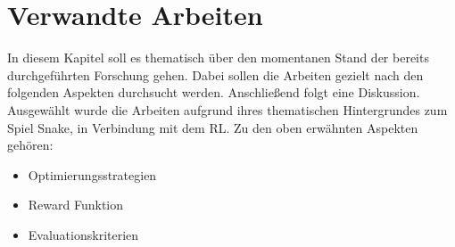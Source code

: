 \chapter{Verwandte Arbeiten} \label{chap:Verwandte_Arbeiten}
In diesem Kapitel soll es thematisch über den momentanen Stand der bereits durchgeführten Forschung gehen. Dabei sollen die Arbeiten gezielt nach den folgenden Aspekten durchsucht werden. Anschließend folgt eine Diskussion. 
Ausgewählt wurde die Arbeiten aufgrund ihres thematischen Hintergrundes zum Spiel Snake, in Verbindung mit dem RL.
Zu den oben erwähnten Aspekten gehören:
\begin{itemize}
	\item Optimierungsstrategien
	\item Reward Funktion
	\item Evaluationskriterien
\end{itemize}

